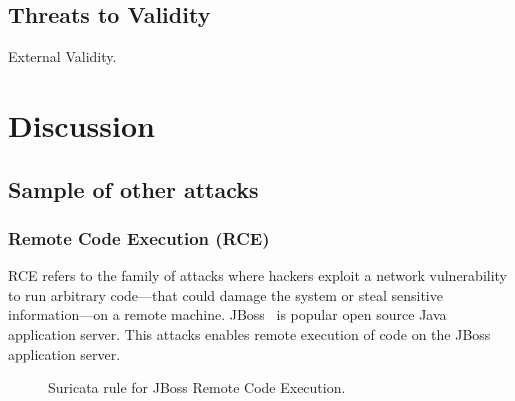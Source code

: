 \documentclass[sigconf,review, anonymous]{acmart}
\begin{document}
\subsection{Threats to Validity}
\label{sec:threats}

External Validity. 


\section{Discussion}

\subsection{Sample of other attacks}

\subsubsection{Remote Code Execution (RCE)}
\label{sec:rce}
\label{sec:jboss}
\label{sec:content-example}


RCE refers to the family of attacks where hackers exploit a network
vulnerability to run arbitrary code---that could damage the system or
steal sensitive information---on a remote machine. JBoss~\cite{jboss}
is popular open source Java application server. This attacks enables
remote execution of code on the JBoss application server.



\begin{figure}[H]
  
  \caption{\label{fig:rule-jboss}Suricata rule for JBoss Remote Code Execution.}
\end{figure}
\end{document}
